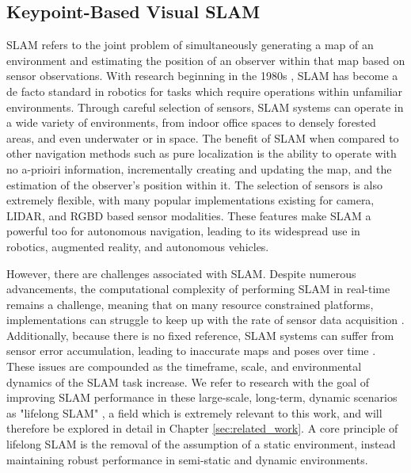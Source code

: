 \subsection{Keypoint-Based Visual SLAM}

SLAM refers to the joint problem of simultaneously generating a map of an environment and estimating the position of an observer within that map based on sensor observations. With research beginning in the 1980s \cite{smithEstimatingUncertainSpatial1988}, SLAM has become a de facto standard in robotics for tasks which require operations within unfamiliar environments. Through careful selection of sensors, SLAM systems can operate in a wide variety of environments, from indoor office spaces to densely forested areas, and even underwater or in space. The benefit of SLAM when compared to other navigation methods such as pure localization is the ability to operate with no a-prioiri information, incrementally creating and updating the map, and the estimation of the observer's position within it. The selection of sensors is also extremely flexible, with many popular implementations existing for camera, LIDAR, and RGBD based sensor modalities. These features make SLAM a powerful too for autonomous navigation, leading to its widespread use in robotics, augmented reality, and autonomous vehicles.

However, there are challenges associated with SLAM. Despite numerous advancements, the computational complexity of performing SLAM in real-time remains a challenge, meaning that on many resource constrained platforms, implementations can struggle to keep up with the rate of sensor data acquisition \cite{semenovaQuantitativeAnalysisSystem2022}. Additionally, because there is no fixed reference, SLAM systems can suffer from sensor error accumulation, leading to inaccurate maps and poses over time \cite{cadenaPresentFutureSimultaneous2016}. These issues are compounded as the timeframe, scale, and environmental dynamics of the SLAM task increase. We refer to research with the goal of improving SLAM performance in these large-scale, long-term, dynamic scenarios as "lifelong SLAM" \cite{shiAreWeReady2020}, a field which is extremely relevant to this work, and will therefore be explored in detail in Chapter \ref{sec:related_work}. A core principle of lifelong SLAM is the removal of the assumption of a static environment, instead maintaining robust performance in semi-static and dynamic environments. 

